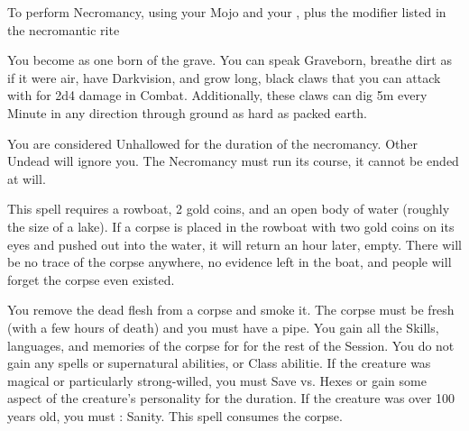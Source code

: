 {%
\newpage



  To perform Necromancy, \RO using your Mojo \UD and your \FOC, plus the modifier listed in the necromantic rite


\NECRO[
  Name=Born of the Grave,
  Link=necromancy-born-of-the-grave,
  Paradigm=Death,
  Save=N,
  Duration=Combat or \LVL Minutes,
  Mod=+3,
  Keywords=None,
  Target=Self
]


You become as one born of the grave.  You can speak Graveborn, breathe dirt as if it were air, have Darkvision, and grow long, black claws that you can attack with for 2d4 damage in Combat.  Additionally, these claws can dig 5m every Minute in any direction through ground as hard as packed earth.  

You are considered Unhallowed for the duration of the necromancy.  Other Undead will ignore you.  The Necromancy must run its course, it cannot be ended at will.

\cbreak

\NECRO[
  Name=Charon's Price,
  Link=necromancy-charon-price,
  Paradigm=Death,
  Save=N,
  Duration=0,
  Mod=+6,
  Keywords=None,
  Target=Corpse in a boat
]


This spell requires a rowboat, 2 gold coins, and an open body of water (roughly the size of a lake).  If a corpse is placed in the rowboat with two gold coins on its eyes and pushed out into the water, it will return an hour later, empty. There will be no trace of the corpse anywhere, no evidence left in the boat, and people will forget the corpse even existed.

\NECRO[
  Name=Corpse Smoke,
  Link=necromancy-corpse-smoke,
  Paradigm=Death,
  Save=N,
  Duration=0,
  Mod=+3,
  Keywords=None,
  Target=Close (touch) Mortal corpse
]


You remove the dead flesh from a corpse and smoke it.  The corpse must be fresh (with a few hours of death) and you must have a pipe.   You gain all the Skills, languages, and memories of the corpse for for the rest of the Session.  You do not gain any spells or supernatural abilities, or Class abilitie. If the creature was magical or particularly strong-willed, you must Save vs. Hexes or gain some aspect of the creature's personality for the duration. If the creature was over 100 years old, you must \RS : Sanity.  This spell consumes the corpse.

}
